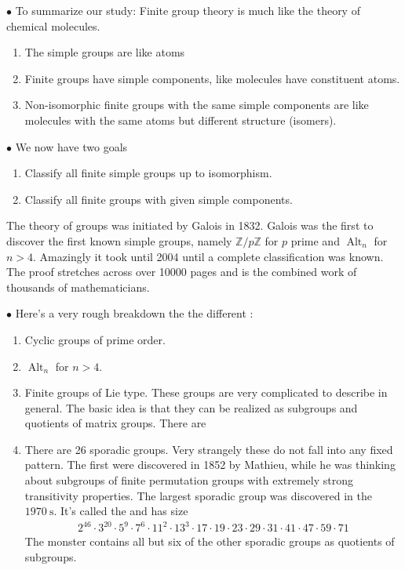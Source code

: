 \documentclass{article}
\newcommand{\Alt}{\operatorname{Alt}}
\begin{document}
$\bullet$ To summarize our study: Finite group theory is much like the theory of chemical molecules.
\begin{enumerate}
    \item The simple groups are like atoms
    \item Finite groups have simple components, like molecules have constituent atoms.
    \item Non-isomorphic finite groups with the same simple components are like molecules with the same atoms but different structure (isomers).

\end{enumerate}

$\bullet$ We now have two goals
\begin{enumerate}
    \item Classify all finite simple groups up to isomorphism.
    \item Classify all finite groups with given simple components.
\end{enumerate}
\begin{rema}
The theory of groups was initiated by Galois in 1832. Galois was the first to discover the first known simple groups, namely $\mathbb{Z} / p \mathbb{Z}$ for $p$ prime and $\Alt_{n}$ for $n>4$. Amazingly it took until 2004 until a complete classification was known. The proof stretches across over 10000 pages and is the combined work of thousands of mathematicians. 
\end{rema}


$\bullet$ Here's a very rough breakdown the the different :
\begin{enumerate}
    \item Cyclic groups of prime order. 
    \item $\Alt_{n}$ for $n>4$.
    \item Finite groups of Lie type. These groups are very complicated to describe in general. The basic idea is that they can be realized as subgroups and quotients of matrix groups. There are 
    \item There are 26 sporadic groups. Very strangely these do not fall into any fixed pattern. The first were discovered in 1852 by Mathieu, while he was thinking about subgroups of finite permutation groups with extremely strong transitivity properties. The largest sporadic group was discovered in the $1970 \mathrm{~s}$. It's called the  and has size
\begin{align*}
2^{46} \cdot 3^{20} \cdot 5^{9} \cdot 7^{6} \cdot 11^{2} \cdot 13^{3} \cdot 17 \cdot 19 \cdot 23 \cdot 29 \cdot 31 \cdot 41 \cdot 47 \cdot 59 \cdot 71
\end{align*}The monster contains all but six of the other sporadic groups as quotients of subgroups.
\end{enumerate}
\end{document}
